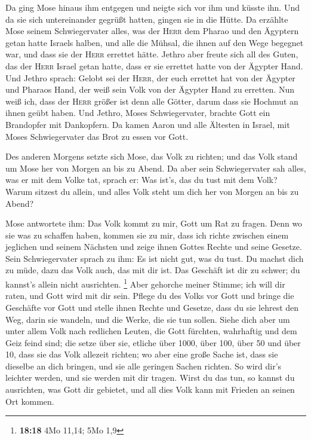  Da ging Mose hinaus ihm entgegen und neigte sich vor ihm
und küsste ihn. Und da sie sich untereinander gegrüßt hatten, gingen sie
in die Hütte.  Da erzählte Mose seinem Schwiegervater
alles, was der \textsc{Herr} dem Pharao und den Ägyptern getan hatte
Israels halben, und alle die Mühsal, die ihnen auf den Wege begegnet
war, und dass sie der \textsc{Herr} errettet hätte. 
Jethro aber freute sich all des Guten, das der \textsc{Herr} Israel
getan hatte, dass er sie errettet hatte von der Ägypter Hand.
 Und Jethro sprach: Gelobt sei der \textsc{Herr}, der
euch errettet hat von der Ägypter und Pharaos Hand, der weiß sein Volk
von der Ägypter Hand zu erretten.  Nun weiß ich, dass der
\textsc{Herr} größer ist denn alle Götter, darum dass sie Hochmut an
ihnen geübt haben.  Und Jethro, Moses Schwiegervater,
brachte Gott ein Brandopfer mit Dankopfern. Da kamen Aaron und alle
Ältesten in Israel, mit Moses Schwiegervater das Brot zu essen vor Gott.

 Des anderen Morgens setzte sich Mose, das Volk zu
richten; und das Volk stand um Mose her von Morgen an bis zu Abend.
 Da aber sein Schwiegervater sah alles, was er mit dem
Volke tat, sprach er: Was ist's, das du tust mit dem Volk? Warum sitzest
du allein, und alles Volk steht um dich her von Morgen an bis zu Abend?

 Mose antwortete ihm: Das Volk kommt zu mir, Gott um Rat
zu fragen.  Denn wo sie was zu schaffen haben, kommen sie
zu mir, dass ich richte zwischen einem jeglichen und seinem Nächsten und
zeige ihnen Gottes Rechte und seine Gesetze.  Sein
Schwiegervater sprach zu ihm: Es ist nicht gut, was du tust.
 Du machst dich zu müde, dazu das Volk auch, das mit dir
ist. Das Geschäft ist dir zu schwer; du kannst's allein nicht
ausrichten. \footnote{\textbf{18:18} 4Mo 11,14; 5Mo 1,9} 
Aber gehorche meiner Stimme; ich will dir raten, und Gott wird mit dir
sein. Pflege du des Volks vor Gott und bringe die Geschäfte vor Gott
 und stelle ihnen Rechte und Gesetze, dass du sie lehrest
den Weg, darin sie wandeln, und die Werke, die sie tun sollen.
 Siehe dich aber um unter allem Volk nach redlichen
Leuten, die Gott fürchten, wahrhaftig und dem Geiz feind sind; die setze
über sie, etliche über 1000, über 100, über 50 und über 10,
 dass sie das Volk allezeit richten; wo aber eine große
Sache ist, dass sie dieselbe an dich bringen, und sie alle geringen
Sachen richten. So wird dir's leichter werden, und sie werden mit dir
tragen.  Wirst du das tun, so kannst du ausrichten, was
Gott dir gebietet, und all dies Volk kann mit Frieden an seinen Ort
kommen.

